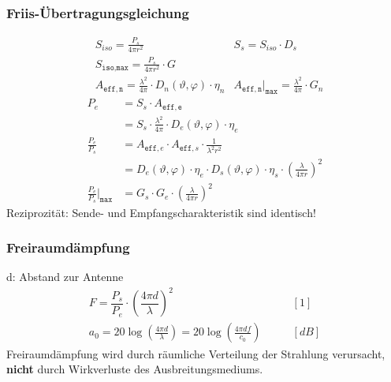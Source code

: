 \subsubsection{Friis-Übertragungsgleichung}
\begin{align*}
	&S_{iso} = \frac{P_s}{4\pi r^2} & S_s = S_{iso} \cdot D_s\\
	&S_{\texttt{iso,max}}=\frac{P_s}{4\pi r^2}\cdot G\\
	&A_{\mathtt{eff,n}} = \frac{\lambda^2}{4\pi}\cdot D_n(\vartheta, \varphi)\cdot \eta_n & A_{\mathtt{eff,n}}\Big|_{\mathtt{max}} = \frac{\lambda^2}{4\pi}\cdot G_n
\end{align*}
\begin{align*}
	P_e & = S_s \cdot A_{\mathtt{eff,e}}\\
	 &=  S_s\cdot \frac{\lambda^2}{4\pi}\cdot D_e(\vartheta, \varphi)\cdot \eta_e\\
    \frac{P_{e}}{P_{s}}          & = A_{\texttt{eff},e}\cdot A_{\texttt{eff},s}\cdot\frac{1}{\lambda^2r^2}                          \\
       & = D_e(\vartheta, \varphi)\cdot\eta_{e}\cdot D_s(\vartheta, \varphi)\cdot\eta_{s}\cdot\left(\frac{\lambda}{4\pi r}\right)^2\\
       \frac{P_{e}}{P_{s}}\Big|_{\mathtt{max}} & = G_{s}\cdot G_{e}\cdot \left(\frac{\lambda}{4\pi r}\right)^2
\end{align*}
Reziprozität: Sende- und Empfangscharakteristik sind identisch! 
\subsubsection{Freiraumdämpfung}
d: Abstand zur Antenne
\begin{align*}
    F = \dfrac{P_{s}}{P_{e}} \cdot \left(\dfrac{4 \pi d}{\lambda}\right)^2                         & \qquad [1]       \\
    a_{0} = 20 \log \left(\frac{4 \pi d}{\lambda}\right) =20 \log \left(\frac{4 \pi d f}{c_{0}}\right) & \qquad [\si{dB}]
\end{align*}
Freiraumdämpfung wird durch räumliche Verteilung der Strahlung verursacht, \textbf{nicht} durch Wirkverluste des Ausbreitungsmediums.
